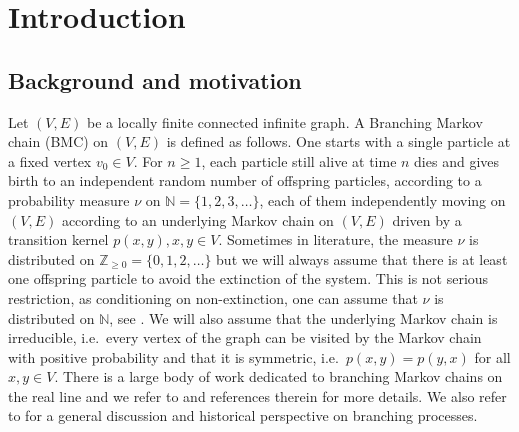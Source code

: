 \documentclass{amsart}
\newcommand{\showcomments}{yes}
\newenvironment{comment}%
{\ifthenelse{\equal{\showcomments}{yes}}%
{\footnotemark
    \begin{lrbox}{\commentbox}
    \begin{minipage}[t]{1.25in}\raggedright\sffamily\upshape\tiny
    \footnotemark[\arabic{footnote}]}%
{\begin{lrbox}{\commentbox}}}%
{\ifthenelse{\equal{\showcomments}{yes}}%
{\end{minipage}\end{lrbox}\marginpar{\usebox{\commentbox}}}%
{\end{lrbox}}}
\theoremstyle{definition}
\theoremstyle{remark}
\begin{document}
\section{Introduction}

\subsection{Background and motivation}%
Let $(V,E)$ be a locally finite connected infinite graph. %
A Branching Markov chain (BMC) on $(V,E)$ is defined as follows.
One starts with a single particle at a fixed vertex $v_0\in V$.
For $n\geq 1$, each particle still alive at time $n$ dies and gives birth to an independent random number of offspring particles, according to a probability measure $\nu$ on $\mathbb N = \{1, 2, 3, \ldots\}$, each of them independently moving on $(V,E)$ according to an underlying Markov chain on $(V,E)$ driven by a transition kernel $p(x,y),x,y\in V$.
Sometimes in literature, the measure $\nu$ is distributed on $\mathbb Z_{\geq 0}=\{0,1,2,\ldots \}$ but
we will always assume that there is at least one offspring particle to avoid the extinction of the system.
This is not serious restriction, as conditioning on non-extinction, one can assume that $\nu$ is distributed on $\mathbb N$, see \cite[Chapter~1]{AN04}.
We will also assume that the underlying Markov chain is irreducible, i.e.\ every vertex of the graph can be visited by the Markov chain with positive probability and that it is symmetric, i.e.\ $p(x,y)=p(y,x)$ for all $x,y\in V$.
There is a large body of work dedicated to branching Markov chains on the real line and we refer to \cite{Shi} and references therein for more details.
We also refer to \cite{AN04} for a general discussion and historical perspective on branching processes.
\end{document}
